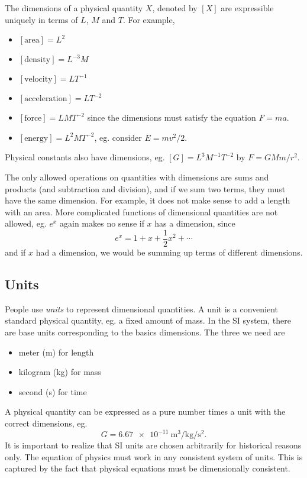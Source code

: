 \documentclass[a4paper]{article}
\begin{document}
The dimensions of a physical quantity $X$, denoted by $[X]$ are expressible uniquely in terms of $L$, $M$ and $T$. For example,
\begin{itemize}
  \item $[\text{area}] = L^2$
  \item $[\text{density}] = L^{-3} M$
  \item $[\text{velocity}] = LT^{-1}$
  \item $[\text{acceleration}] = LT^{-2}$
  \item $[\text{force}] = LMT^{-2}$ since the dimensions must satisfy the equation $F = ma$.
  \item $[\text{energy}] = L^2MT^{-2}$, eg. consider $E = mv^2/2$.
\end{itemize}

Physical constants also have dimensions, eg. $[G] = L^3M^{-1}T^{-2}$ by $F = GMm/r^2$.

The only allowed operations on quantities with dimensions are sums and products (and subtraction and division), and if we sum two terms, they must have the same dimension. For example, it does not make sense to add a length with an area. More complicated functions of dimensional quantities are not allowed, eg. $e^{x}$ again makes no sense if $x$ has a dimension, since
\[
  e^x = 1 + x + \frac{1}{2}x^2 + \cdots
\]
and if $x$ had a dimension, we would be summing up terms of different dimensions.
\subsection{Units}
People use \emph{units} to represent dimensional quantities. A unit is a convenient standard physical quantity, eg. a fixed amount of mass. In the SI system, there are base units corresponding to the basics dimensions. The three we need are
\begin{itemize}
  \item meter (m) for length
  \item kilogram (kg) for mass
  \item second (s) for time
\end{itemize}
A physical quantity can be expressed as a pure number times a unit with the correct dimensions, eg.
\[
  G = \SI{6.67e-11}{\meter\cubed\per\kilogram\per\second\squared}.
\]
It is important to realize that SI units are chosen arbitrarily for historical reasons only. The equation of physics must work in any consistent system of units. This is captured by the fact that physical equations must be dimensionally consistent.
\end{document}
